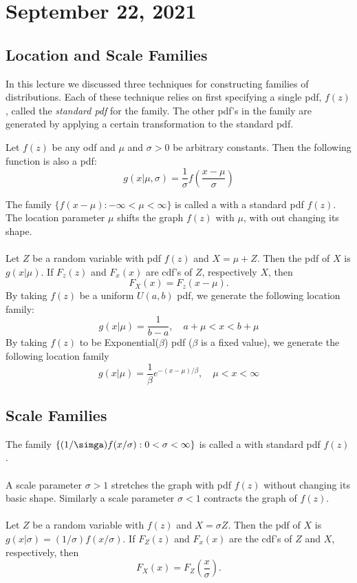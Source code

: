 \section{September 22, 2021}
\subsection{Location and Scale Families}
In this lecture we discussed three techniques for constructing families of distributions. Each of these technique relies on first specifying a single pdf,
$f(z)$, called the \textit{standard pdf} for the family. The other pdf's in the family are generated by applying a certain transformation to the standard pdf. 

\begin{theorem}
    Let $f(z)$ be any odf and $\mu$ and $\sigma >0$ be arbitrary constants. Then the following function is also a pdf:
    $$
    g(x|\mu, \sigma) = \frac{1}{\sigma}f \left ( 
    \frac{x-\mu}{\sigma}
    \right )
    $$
\end{theorem}
The family $\{ f(x-\mu): - \infty < \mu < \infty \}$ is called a  with a standard pdf $f(z)$. The location parameter $\mu$ shifts the graph $f(z)$ with $\mu$, with out changing its shape.\\
\\
 Let $Z$ be a random variable with pdf $f(z)$ and $X = \mu + Z$. Then the pdf of $X$ is $g(x|\mu)$. If $F_z(z)$ and $F_x(x)$ are cdf's of $Z$, respectively $X$, then
$$
F_X(x) = F_z(x-\mu).
$$
 By taking $f(z)$ be a uniform $U(a,b)$ pdf, we generate the following location family:
$$
g(x|\mu) = \frac{1}{b-a}, \quad a+\mu < x < b + \mu
$$
 By taking $f(z)$ to be Exponential($\beta$) pdf ($\beta$ is a fixed value), we generate the following location family
$$
g(x|\mu) = \frac{1}{\beta}e^{-(x-\mu)/\beta}, \quad \mu <x< \infty
$$
\subsection{Scale Families}
The family $\{ (1/\simga)f(x/\sigma): 0 < \sigma < \infty \}$ is called a  with standard pdf $f(z)$.
\\ \\
A scale parameter $\sigma > 1$ stretches the graph with pdf $f(z)$ without changing its basic shape. Similarly a scale parameter $\sigma < 1$ contracts the graph of $f(z)$. 
\\\\
 Let $Z$ be a random variable with $f(z)$ and $X = \sigma Z$. Then the pdf of $X$ is $g(x|\sigma) = (1/\sigma)f(x/\sigma)$. If $F_Z(z)$ and $F_x(x)$ are the cdf's of $Z$ and $X$,  respectively, then
$$
F_X(x) = F_Z \left( \frac{x}{\sigma} \right).
$$

